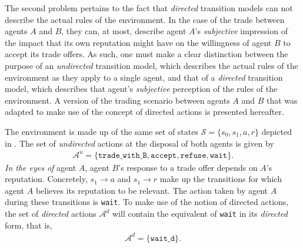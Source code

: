 The second problem pertains to the fact that \textit{directed} transition models can not describe the actual rules of the environment. In the case of the trade between agents $A$ and $B$, they can, at most, describe agent $A$'s \textit{subjective} impression of the impact that its own reputation might have on the willingness of agent $B$ to accept its trade offers. 
As such, one must make a clear distinction between the purpose of an \textit{undirected} transition model, which describes the actual rules of the environment as they apply to a single agent, and that of a \textit{directed} transition model, which describes that agent's \textit{subjective} perception of the rules of the environment. A version of the trading scenario between agents $A$ and $B$ that was adapted to make use of the concept of directed actions is presented hereafter.

The environment is made up of the same set of states $\mathcal{S} = \{s_0, s_1, a, r\}$ depicted in . The set of \textit{undirected} actions at the disposal of both agents is given by
\begin{align}
    \mathcal{A}^u = \{\texttt{trade\_with\_B}, \texttt{accept}, \texttt{refuse}, \texttt{wait}\}.
\end{align}
\textit{In the eyes of} agent $A$, agent $B$'s response to a trade offer depends on $A$'s reputation. Concretely, $s_1 \rightarrow a$ and $s_1 \rightarrow r$
make up the transitions for which agent $A$ believes its reputation to be relevant. The action taken by agent $A$ during these transitions is \texttt{wait}. To make use of the notion of directed actions, the set of \textit{directed} actions $\mathcal{A}^d$ will contain the equivalent of \texttt{wait} in its \textit{directed} form, that is,
\begin{align}
    \mathcal{A}^d = \{\texttt{wait\_d}\}.
\end{align}

